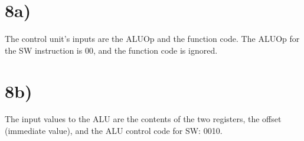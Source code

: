 \documentclass[a4paper,11pt]{article}
\begin{document}
\section*{8a)}
The control unit's inputs are the ALUOp and the function code.  The ALUOp for the SW instruction is 00, and the function code is
ignored.

\section*{8b)}
The input values to the ALU are the contents of the two registers, the offset (immediate value), and the ALU control code for SW: 0010.

\end{document}
